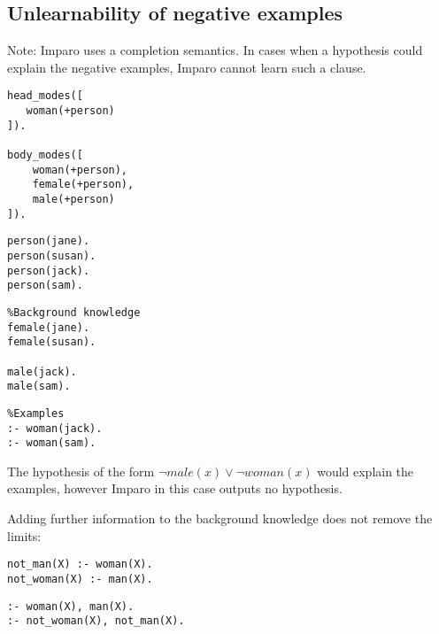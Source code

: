 \subsection{Unlearnability of negative examples}
Note: Imparo uses a completion semantics.
In cases when a hypothesis could explain the negative examples, Imparo cannot learn such a clause.

\begin{minipage}[t]{.25\textwidth}
\begin{lstlisting}
head_modes([
   woman(+person)
]).

body_modes([
    woman(+person),
    female(+person),
    male(+person)
]).
\end{lstlisting}
\end{minipage}
\begin{minipage}[t]{.20\textwidth}
\begin{lstlisting}
person(jane).
person(susan).
person(jack).
person(sam).
\end{lstlisting}
\end{minipage}
\begin{minipage}[t]{.30\textwidth}
\begin{lstlisting}
%Background knowledge
female(jane).
female(susan).

male(jack).
male(sam).
\end{lstlisting}
\end{minipage}
\begin{minipage}[t]{.25\textwidth}
\begin{lstlisting}
%Examples
:- woman(jack).
:- woman(sam).
\end{lstlisting}
\end{minipage}

The hypothesis of the form $\neg male(x) \vee \neg woman(x)$ would explain the examples, however Imparo in this case outputs no hypothesis.

Adding further information to the background knowledge does not remove the limits:

\begin{minipage}[t]{.45\textwidth}
\begin{lstlisting}
not_man(X) :- woman(X).
not_woman(X) :- man(X).
\end{lstlisting}
\end{minipage}
\begin{minipage}[t]{.20\textwidth}
\begin{lstlisting}
:- woman(X), man(X).
:- not_woman(X), not_man(X).
\end{lstlisting}
\end{minipage}

